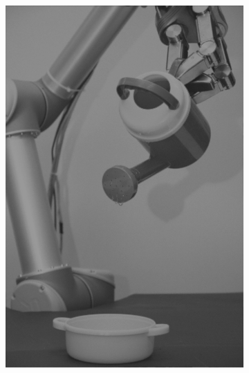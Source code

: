 \begin{figure}[H]
\begin{subfigure}[b]{0.1\textwidth}
        \includegraphics[width=\textwidth]{img3/test/contrast_5_0_6_final_img3.png}
    \end{subfigure}
    \begin{subfigure}[b]{0.1\textwidth}

\end{subfigure}
\end{figure}
